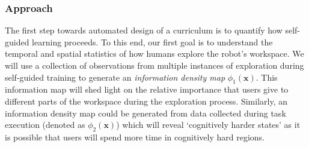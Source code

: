 \documentclass[12pt]{article}
\begin{document}
%	
%
%
%
%
%
%
\subsubsection{Approach}
The first step towards automated design of a curriculum is to quantify how self-guided learning proceeds. To this end, our first goal is to understand the temporal and spatial statistics of how humans explore the robot's workspace. We will use a collection of observations from multiple instances of exploration during self-guided training to generate an \textit{information density map} $\phi_{1}(\boldsymbol{x})$. This information map will shed light on the relative importance that users give to different parts of the workspace during the exploration process. Similarly, an information density map could be generated from data collected during task execution (denoted as $\phi_{2}(\boldsymbol{x})$) which will reveal `cognitively harder states' as it is possible that users will spend more time in cognitively hard regions. 
\end{document}
